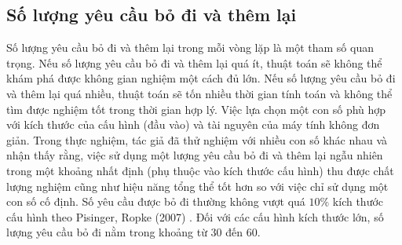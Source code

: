 \subsection{Số lượng yêu cầu bỏ đi và thêm lại}
\label{sec:num_rm_req}
Số lượng yêu cầu bỏ đi và thêm lại trong mỗi vòng lặp là một tham số quan trọng. Nếu số lượng yêu cầu bỏ đi và thêm lại quá ít, thuật toán sẽ không thể khám phá được không gian nghiệm một cách đủ lớn. Nếu số lượng yêu cầu bỏ đi và thêm lại quá nhiều, thuật toán sẽ tốn nhiều thời gian tính toán và không thể tìm được nghiệm tốt trong thời gian hợp lý. Việc lựa chọn một con số phù hợp với kích thước của cấu hình (đầu vào) và tài nguyên của máy tính không đơn giản. Trong thực nghiệm, tác giả đã thử nghiệm với nhiều con số khác nhau và nhận thấy rằng, việc sử dụng một lượng yêu cầu bỏ đi và thêm lại ngẫu nhiên trong một khoảng nhất định (phụ thuộc vào kích thước cấu hình) thu được chất lượng nghiệm cũng như hiệu năng tổng thể tốt hơn so với việc chỉ sử dụng một con số cố định. Số yêu cầu được bỏ đi thường không vượt quá $10\%$ kích thước cấu hình theo Pisinger, Ropke (2007) \cite{pisinger2007general}. Đối với các cấu hình kích thước lớn, số lượng yêu cầu bỏ đi nằm trong khoảng từ 30 đến 60.